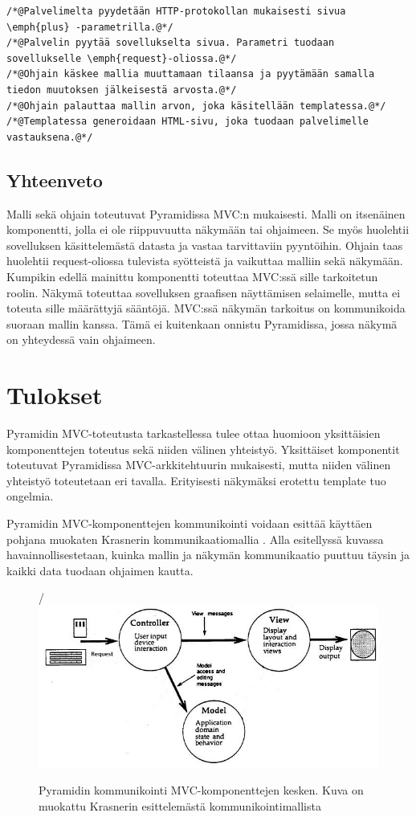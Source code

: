 \documentclass[finnish,utf8,nonumbib,palatino,kandi]{gradu2}
\begin{document}
\begin{lstlisting}
/*@Palvelimelta pyydetään HTTP-protokollan mukaisesti sivua \emph{plus} -parametrilla.@*/
/*@Palvelin pyytää sovellukselta sivua. Parametri tuodaan sovellukselle \emph{request}-oliossa.@*/
/*@Ohjain käskee mallia muuttamaan tilaansa ja pyytämään samalla tiedon muutoksen jälkeisestä arvosta.@*/
/*@Ohjain palauttaa mallin arvon, joka käsitellään templatessa.@*/
/*@Templatessa generoidaan HTML-sivu, joka tuodaan palvelimelle vastauksena.@*/
\end{lstlisting}

\subsection{Yhteenveto}
Malli sekä ohjain toteutuvat Pyramidissa MVC:n mukaisesti. Malli on itsenäinen komponentti, jolla ei ole riippuvuutta näkymään tai ohjaimeen. Se myös huolehtii sovelluksen käsittelemästä datasta ja vastaa tarvittaviin pyyntöihin. Ohjain taas huolehtii request-oliossa tulevista syötteistä ja vaikuttaa malliin sekä näkymään.  Kumpikin edellä mainittu komponentti toteuttaa MVC:ssä sille tarkoitetun roolin. Näkymä toteuttaa sovelluksen graafisen näyttämisen selaimelle, mutta ei toteuta sille määrättyjä sääntöjä. MVC:ssä näkymän tarkoitus on kommunikoida suoraan mallin kanssa. Tämä ei kuitenkaan onnistu Pyramidissa, jossa näkymä on yhteydessä vain ohjaimeen.

\section{Tulokset}
Pyramidin MVC-toteutusta tarkastellessa tulee ottaa huomioon yksittäisien komponenttejen toteutus sekä niiden välinen yhteistyö. Yksittäiset komponentit toteutuvat Pyramidissa MVC-arkkitehtuurin mukaisesti, mutta niiden välinen yhteistyö
toteutetaan eri tavalla. Erityisesti näkymäksi erotettu template tuo ongelmia.

Pyramidin MVC-komponenttejen kommunikointi voidaan esittää käyttäen pohjana muokaten Krasnerin kommunikaatiomallia \cite{Krasner:desc}.
Alla esitellyssä kuvassa havainnollisestetaan, kuinka mallin ja näkymän kommunikaatio puuttuu täysin ja kaikki data tuodaan ohjaimen kautta.

\begin{figure}[h]
\centering/
\includegraphics[scale=0.85]{pyramid_mvc.jpg}
\caption{Pyramidin kommunikointi MVC-komponenttejen kesken. Kuva on muokattu Krasnerin esittelemästä kommunikointimallista \cite{Krasner:desc}  }
\end{figure}
\end{document}
